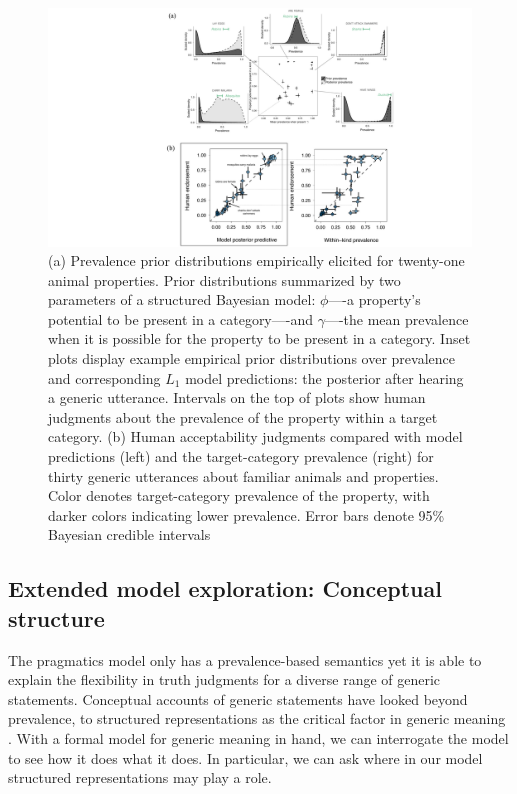\documentclass[12pt,letterpaper]{article}
\begin{document}
\begin{figure}
\centering
    \includegraphics[width=\columnwidth]{generics-prior-prevalence-tj.pdf}
    \caption{(a) 
    Prevalence prior distributions empirically elicited for twenty-one animal properties.
    Prior distributions summarized by two parameters of a structured Bayesian model: $\phi$----a property's potential to be present in a category----and $\gamma$----the mean prevalence when it is possible for the property to be present in a category.
    Inset plots display example empirical prior distributions over prevalence and corresponding $L_1$ model predictions: the posterior after hearing a generic utterance. 
    Intervals on the top of plots show human judgments about the prevalence of the property within a target category.
    (b)
    Human acceptability judgments compared with model predictions (left) and the target-category prevalence (right) for thirty generic utterances about familiar animals and properties. 
    Color denotes target-category prevalence of the property, with darker colors indicating lower prevalence. 
     Error bars denote 95\% Bayesian credible intervals
    }
  \label{fig:commongenerics}

\end{figure}



\subsection*{Extended model exploration: Conceptual structure}

The pragmatics model only has a prevalence-based semantics yet it is able to explain the flexibility in truth judgments for a diverse range of generic statements.
Conceptual accounts of generic statements have looked beyond prevalence, to structured representations as the critical factor in generic meaning \cite{Leslie2007, Prasada2013}. 
With a formal model for generic meaning in hand, we can interrogate the model to see how it does what it does.
In particular, we can ask where in our model structured representations may play a role. 
\end{document}
